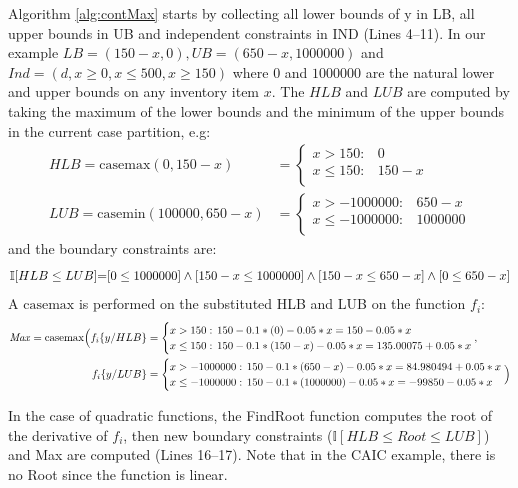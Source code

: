 \documentclass[twoside,11pt]{article}
\newcommand{\casemax}{\mathrm{casemax}}
\newcommand{\casemin}{\mathrm{casemin}}
\newcommand{\UB}{\mathit{UB}}
\newcommand{\LB}{\mathit{LB}}
\newcommand{\IND}{\mathit{Ind}}
\newcommand{\Max}{\mathit{Max}}
\newcommand{\sq}{\hspace{-1mm}}
\newcommand{\sqm}{\hspace{-2mm}}
\begin{document}
Algorithm \ref{alg:contMax} starts by collecting all lower bounds of y in LB, all upper bounds in UB and independent constraints in IND (Lines 4--11).
In our example  $\LB = (150 - x, 0) , \UB= (650 - x, 1000000) $ and $\IND=(d,x \geq 0 , x \leq 500, x \geq 150) $ where $0$ and $1000000$ are the natural lower and upper bounds on any inventory item $x$.
The $HLB$ and $LUB$ are computed by taking the maximum of the lower bounds and the minimum of the upper bounds in the current case partition, e.g:
{%
\begin{align*}
HLB = \casemax(0,150-x) & = \begin{cases}
x > 150: & 0\\ 
x \leq 150: & 150 -x \\ 
\end{cases}\\
LUB = \casemin(100000, 650-x) & = \begin{cases}
x > -1000000: & 650 -x  \\ 
x \leq -1000000: &1000000\\ 
\end{cases}
\end{align*}
}  
and the boundary constraints are:
{\footnotesize 
\begin{equation*}
\mathbb{I} [HLB \leq LUB] \sq = \sq [0 \leq 1000000] %
\land [150 - x \leq 1000000] \land [150-x \leq 650 -x] \land [0 \leq 650 - x] 
\end{equation*}}
A $\casemax$ is performed on the substituted HLB and LUB  on the function $f_i$: 
{\footnotesize 
\begin{align*}
 \Max = \casemax \Big( 
 f_i \{ y / HLB \} &= \begin{cases}
x > 150: & \sqm 150 - 0.1 * (0) - 0.05 * x = 150 - 0.05 * x \\ 
x \leq 150:    & \sqm 150 - 0.1 * (150 - x ) - 0.05 * x = 135.00075 + 0.05 * x\\ 
\end{cases},\\
 f_i \{ y / LUB \} &= \begin{cases}
x > -1000000:    & \sqm 150 - 0.1 * (650 -x) - 0.05 * x = 84.980494 + 0.05 * x \\ 
x \leq -1000000: & \sqm 150 - 0.1 * (1000000) - 0.05 * x =  -99850 -0.05 * x\\ 
\end{cases} \Big) 
\end{align*}}

In the case of quadratic functions, the {\sc FindRoot} function computes the root of the derivative of $f_i$, then new boundary constraints ($\mathbb{I}[HLB \leq Root \leq LUB]$) and Max are computed (Lines 16--17). Note that in the CAIC example, there is no Root since the function is linear. 
\end{document}

